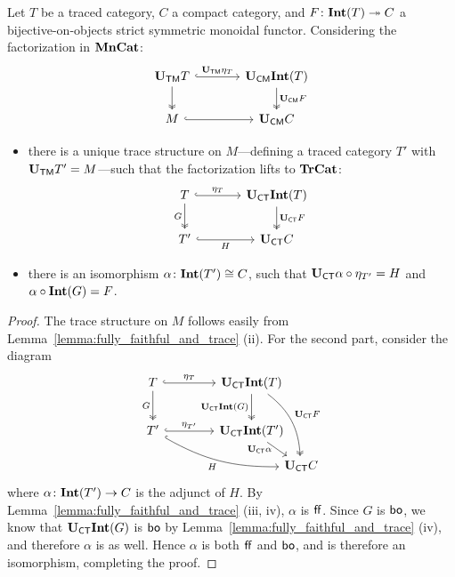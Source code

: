 \documentclass[11pt,oneside,article]{memoir}
\begin{document}
\begin{lemma}\label{lem:Tr_bo_Int}
   Let $T$ be a traced category, $C$ a compact category, and $F\colon\mathbf{Int}(T)\twoheadrightarrow C$ a
   bijective-on-objects strict symmetric monoidal functor. Considering the factorization in
   $\mathbf{MnCat}$:
   \begin{equation*}
      \begin{tikzcd}[column sep=large]
         \UTM T \ar[r,hook,"\UTM\eta_{T}"] \ar[d,two heads]
            & \UCM\Int(T) \ar[d,two heads,"\UCM F"] \\
         M \ar[r,hook] & \UCM C
      \end{tikzcd}
   \end{equation*}
   \begin{itemize}
      \item there is a unique trace structure on $M$---defining a traced category $T'$ with $\mathbf{U}_{\mathsf{TM}}
         T'=M$---such that the factorization lifts to $\mathbf{TrCat}$:
         \begin{equation*}
            \begin{tikzcd}[column sep=large]
               T \ar[r,hook,"\eta_{T}"] \ar[d,two heads,"G"']
                  & \UCT\Int(T) \ar[d,two heads,"\UCT F"] \\
               T' \ar[r,hook,"H"'] & \UCT C
            \end{tikzcd}
         \end{equation*}
      \item there is an isomorphism $\alpha\colon\mathbf{Int}(T')\cong C$, such that $\mathbf{U}_{\mathsf{CT}}\alpha\circ
         \eta_{T'}=H$ and $\alpha\circ\mathbf{Int}(G)=F$.
   \end{itemize}
\end{lemma}
\begin{proof}
   The trace structure on $M$ follows easily from Lemma~\ref{lemma:fully_faithful_and_trace} (ii).
   For the second part, consider the diagram
   \begin{equation*}
      \begin{tikzcd}[column sep=4em, row sep=5ex]
         T \ar[r,hook,"\eta_{T}"] \ar[d,two heads,"G"']
            & \UCT\Int(T) \ar[d,two heads,"\UCT\Int(G)"']
               \ar[ddr,two heads,bend left=25,"\UCT F"] &[between origins] \\
         T' \ar[r,hook,"\eta_{T'}"] \ar[drr,hook,bend right=15,"H"']
            & \UCT\Int(T') \ar[dr,"\UCT\alpha"' {inner sep=0pt,pos=.25}] & \\[-10]
         &&\UCT C
      \end{tikzcd}
   \end{equation*}
   where $\alpha\colon\mathbf{Int}(T')\to C$ is the adjunct of $H$. By
   Lemma~\ref{lemma:fully_faithful_and_trace} (iii, iv), $\alpha$ is $\mathsf{ff}$. Since $G$ is $\mathsf{bo}$, we
   know that $\mathbf{U}_{\mathsf{CT}}\mathbf{Int}(G)$ is $\mathsf{bo}$ by Lemma~\ref{lemma:fully_faithful_and_trace} (iv), and
   therefore $\alpha$ is as well. Hence $\alpha$ is both $\mathsf{ff}$ and $\mathsf{bo}$, and is therefore an
   isomorphism, completing the proof.
\end{proof}
\end{document}
